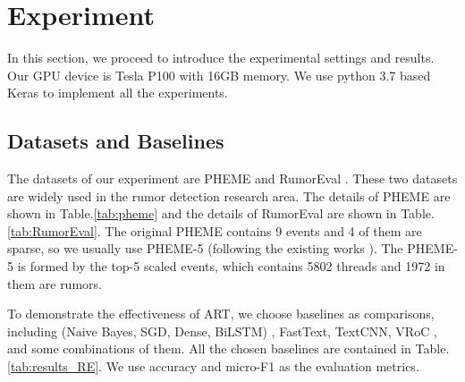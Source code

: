 \section{Experiment}
\label{sec:experiment}
In this section, we proceed to introduce the experimental settings and results. Our GPU device is Tesla P100 with 16GB memory. We use python 3.7 based Keras to implement all the experiments.

\subsection{Datasets and Baselines}
\label{sec:dataset}
The datasets of our experiment are  PHEME \cite{DBLP:conf/coling/KochkinaLZ18} and RumorEval \cite{DBLP:conf/semeval/EnayetE17}. These two datasets are widely used in the rumor detection research area. The details of PHEME are shown in Table.\ref{tab:pheme} and the details of RumorEval are shown in Table.\ref{tab:RumorEval}. The original PHEME contains 9 events and 4 of them are sparse, so we usually use PHEME-5 (following the existing works \cite{DBLP:conf/www/ChengNB20}). The PHEME-5 is formed by the top-5 scaled events, which contains 5802 threads and 1972 in them are rumors. 

To demonstrate the effectiveness of ART, we choose baselines as comparisons, including (Naive Bayes, SGD, Dense, BiLSTM) \cite{DBLP:conf/emnlp/QazvinianRRM11}, FastText\cite{DBLP:conf/eacl/GraveMJB17}, TextCNN\cite{DBLP:conf/emnlp/Kim14}, VRoC \cite{DBLP:conf/www/ChengNB20}, and some combinations of them. All the chosen baselines are contained in Table.\ref{tab:results_RE}. We use accuracy and micro-F1 as the evaluation metrics.

\begin{table}[htbp]
	\caption{PHEME}
	\centering
	\label{tab:pheme}
\end{table}

